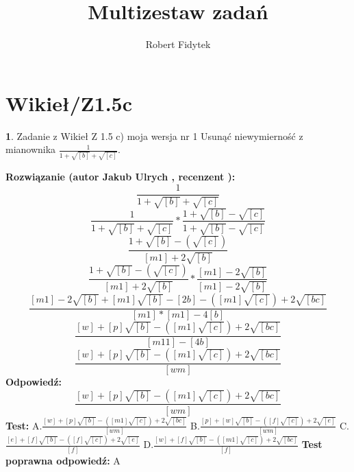 \documentclass[12pt, a4paper]{article}
\title{Multizestaw zadań}
\author{Robert Fidytek}
\date{}
\theoremstyle{definition} %
\newtheorem{zad}{}
\newcommand{\kategoria}[1]{\section{#1}} %
\newcommand{\zadStart}[1]{\begin{zad}#1\newline} %
\newcommand{\zadStop}{\end{zad}}   %
\newcommand{\rozwStart}[2]{\noindent \textbf{Rozwiązanie (autor #1 , recenzent #2): }\newline} %
\newcommand{\rozwStop}{\newline}                                            %
\newcommand{\odpStart}{\noindent \textbf{Odpowiedź:}\newline}    %
\newcommand{\odpStop}{\newline}                                             %
\newcommand{\testStart}{\noindent \textbf{Test:}\newline} %
\newcommand{\testStop}{\newline} %
\newcommand{\kluczStart}{\noindent \textbf{Test poprawna odpowiedź:}\newline} %
\newcommand{\kluczStop}{\newline} %
\begin{document}
\maketitle


\kategoria{Wikieł/Z1.5c}
\zadStart{Zadanie z Wikieł Z 1.5 c) moja wersja nr 1}
Usunąć niewymierność z mianownika $\frac{1}{1+\sqrt{[b]}+\sqrt{[c]}}$.
\zadStop
\rozwStart{Jakub Ulrych}{}
$$\frac{1}{1+\sqrt{[b]}+\sqrt{[c]}}$$
$$\frac{1}{1+\sqrt{[b]}+\sqrt{[c]}}*\frac{1+\sqrt{[b]}-\sqrt{[c]}}{1+\sqrt{[b]}-\sqrt{[c]}}$$
$$\frac{1+\sqrt{[b]}-(\sqrt{[c]})}{[m1]+2\sqrt{[b]}}$$
$$\frac{1+\sqrt{[b]}-(\sqrt{[c]})}{[m1]+2\sqrt{[b]}}*\frac{[m1]-2\sqrt{[b]}}{[m1]-2\sqrt{[b]}}$$
$$\frac{[m1]-2\sqrt{[b]}+[m1]\sqrt{[b]}-[2b]-([m1]\sqrt{[c]})+2\sqrt{[bc]}}{[m1]*[m1]-4[b]}$$
$$\frac{[w]+[p]\sqrt{[b]}-([m1]\sqrt{[c]})+2\sqrt{[bc]}}{[m11]-[4b]}$$
$$\frac{[w]+[p]\sqrt{[b]}-([m1]\sqrt{[c]})+2\sqrt{[bc]}}{[wm]}$$
\rozwStop
\odpStart
$$\frac{[w]+[p]\sqrt{[b]}-([m1]\sqrt{[c]})+2\sqrt{[bc]}}{[wm]}$$
\odpStop
\testStart
A.$\frac{[w]+[p]\sqrt{[b]}-([m1]\sqrt{[c]})+2\sqrt{[bc]}}{[wm]}$
B.$\frac{[p]+[w]\sqrt{[b]}-([f]\sqrt{[c]})+2\sqrt{[e]}}{[wm]}$
C.$\frac{[e]+[f]\sqrt{[b]}-([f]\sqrt{[c]})+2\sqrt{[e]}}{[f]}$
D.$\frac{[w]+[f]\sqrt{[b]}-([m1]\sqrt{[c]})+2\sqrt{[bc]}}{[f]}$
\testStop
\kluczStart
A
\kluczStop
\end{document}
